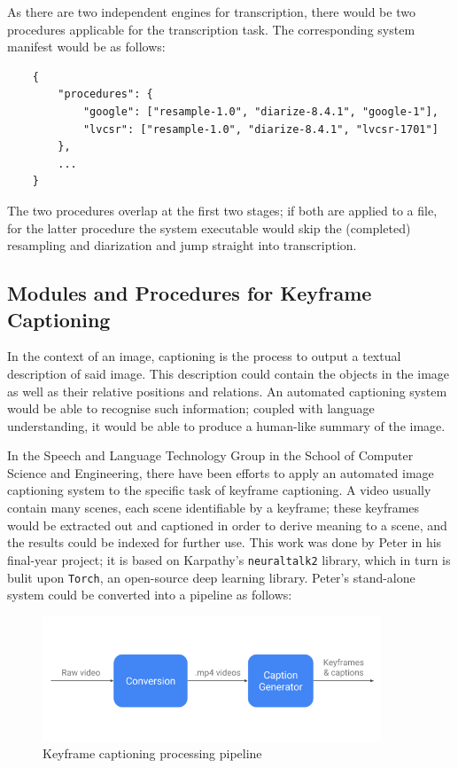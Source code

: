 As there are two independent engines for transcription, there would be two procedures applicable for the transcription task. The corresponding system manifest would be as follows:

\begin{lstlisting}
    {
        "procedures": {
            "google": ["resample-1.0", "diarize-8.4.1", "google-1"],
            "lvcsr": ["resample-1.0", "diarize-8.4.1", "lvcsr-1701"]
        },
        ...
    }
\end{lstlisting}

The two procedures overlap at the first two stages; if both are applied to a file, for the latter procedure the system executable would skip the (completed) resampling and diarization and jump straight into transcription.

\subsection{Modules and Procedures for Keyframe Captioning}

In the context of an image, captioning is the process to output a textual description of said image. This description could contain the objects in the image as well as their relative positions and relations. An automated captioning system would be able to recognise such information; coupled with language understanding, it would be able to produce a human-like summary of the image.

In the Speech and Language Technology Group in the School of Computer Science and Engineering, there have been efforts to apply an automated image captioning system to the specific task of keyframe captioning. A video usually contain many scenes, each scene identifiable by a keyframe; these keyframes would be extracted out and captioned in order to derive meaning to a scene, and the results could be indexed for further use. This work was done by Peter in his final-year project; it is based on Karpathy's \texttt{neuraltalk2} library, which in turn is bulit upon \texttt{Torch}, an open-source deep learning library. Peter's stand-alone system could be converted into a pipeline as follows:

\begin{figure}[h]
\begin{center}
    \includegraphics[width=0.9\textwidth]{../images/pipeline_capgen.png}
    \caption{Keyframe captioning processing pipeline}
\end{center}
\end{figure}

